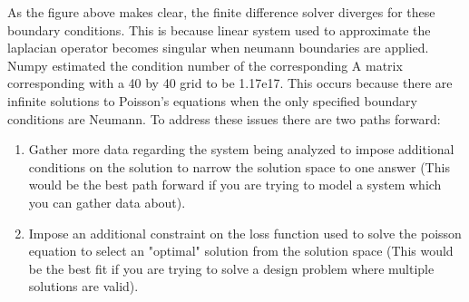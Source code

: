 \documentclass[12pt]{article}
\begin{document}
\begin{enumerate}
            As the figure above makes clear, the finite difference solver diverges for these boundary conditions. This is because linear system used to approximate the laplacian operator becomes singular when neumann boundaries are applied. Numpy estimated the condition number of the corresponding A matrix corresponding with a 40 by 40 grid to be 1.17e17. This occurs because there are infinite solutions to Poisson's equations when the only specified boundary conditions are Neumann. To address these issues there are two paths forward:
            \begin{enumerate}
                \item Gather more data regarding the system being analyzed to impose additional conditions on the solution to narrow the solution space to one answer (This would be the best path forward if you are trying to model a system which you can gather data about).
                \item Impose an additional constraint on the loss function used to solve the poisson equation to select an "optimal" solution from the solution space (This would be the best fit if you are trying to solve a design problem where multiple solutions are valid).
            \end{enumerate}

        \end{enumerate}
\end{document}
